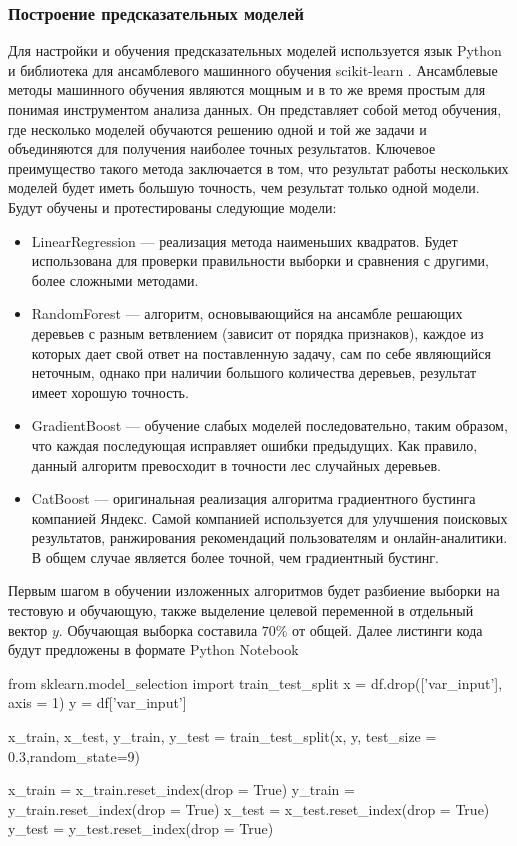 \subsubsection{Построение предсказательных моделей}
Для настройки и обучения предсказательных моделей используется язык Python и библиотека для ансамблевого машинного обучения scikit-learn \cite{hackeling2017mastering}. Ансамблевые методы машинного обучения являются мощным и в то же время простым для понимая инструментом анализа данных. Он представляет собой метод обучения, где несколько моделей обучаются решению одной и той же задачи и объединяются для получения наиболее точных результатов. Ключевое преимущество такого метода заключается в том, что результат работы нескольких моделей будет иметь большую точность, чем результат только одной модели.
Будут обучены и протестированы следующие модели:
\begin{itemize}
	\item LinearRegression --- реализация метода наименьших квадратов. Будет использована для проверки правильности выборки и сравнения с другими, более сложными методами.
	\item RandomForest \cite{rigatti2017random} --- алгоритм, основывающийся на ансамбле решающих деревьев с разным ветвлением (зависит от порядка признаков), каждое из которых дает свой ответ на поставленную задачу, сам по себе являющийся неточным, однако при наличии большого количества деревьев, результат имеет хорошую точность.
	\item GradientBoost \cite{natekin2013gradient} --- обучение слабых моделей последовательно, таким образом, что каждая последующая исправляет ошибки предыдущих. Как правило, данный алгоритм превосходит в точности лес случайных деревьев.
	\item CatBoost \cite{hancock2020catboost} --- оригинальная реализация алгоритма градиентного бустинга компанией Яндекс. Самой компанией используется для улучшения поисковых результатов,  ранжирования рекомендаций пользователям и онлайн-аналитики. В общем случае является более точной, чем градиентный бустинг.
\end{itemize}

Первым шагом в обучении изложенных алгоритмов будет разбиение выборки на тестовую и обучающую, также выделение целевой переменной в отдельный вектор $y$. Обучающая выборка составила $70\%$ от общей. Далее листинги кода будут предложены в формате Python Notebook
\begin{pyin}
from sklearn.model_selection import train_test_split
x = df.drop(['var_input'], axis = 1)
y = df['var_input']

x_train, x_test, y_train, y_test = train_test_split(x, y, test_size = 0.3,random_state=9)

x_train = x_train.reset_index(drop = True)
y_train = y_train.reset_index(drop = True)
x_test = x_test.reset_index(drop = True)
y_test = y_test.reset_index(drop = True)
\end{pyin}

